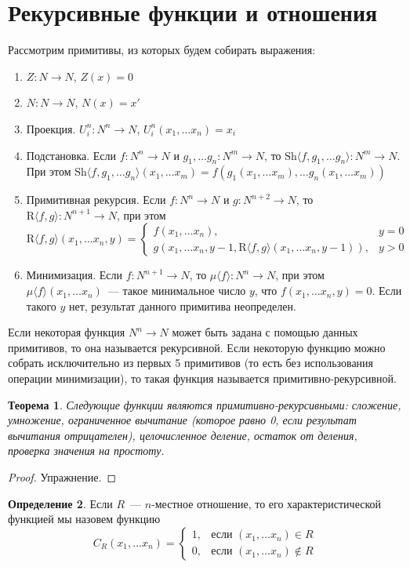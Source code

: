 \documentclass[a4paper,11pt]{article}
\newtheorem{thm}{Теорема}[section]
\theoremstyle{definition}
\newtheorem{dfn}[thm]{Определение}
\newcommand{\Sh}[1]{\mathrm{Sh}\langle #1\rangle}
\newcommand{\Rr}[1]{\mathrm{R}\langle #1\rangle}
\newcommand{\Mn}[1]{\mu\langle #1\rangle}
\begin{document}
\section{Рекурсивные функции и отношения}
Рассмотрим примитивы, из которых будем собирать выражения:
\begin{enumerate}
\item $Z : N \to N$, $Z(x) = 0$
\item $N : N \to N$, $N(x) = x'$
\item Проекция. $U^n_i : N^n \to N$, $U^n_i(x_1, \dots x_n) = x_i$
\item Подстановка. Если $f : N^n \to N$ и $g_1, \dots g_n : N^m \to N$, то
  $\Sh{f, g_1, \dots g_n} : N^m \to N$. При этом
  $\Sh{f, g_1, \dots g_n}(x_1, \dots x_m) = f(g_1(x_1, \dots x_m), \dots
  g_n(x_1, \dots x_m))$
\item Примитивная рекурсия. Если $f : N^n \to N$ и $g : N^{n+2} \to N$, то
  $\Rr{f, g} : N^{n+1} \to N$, при этом
  \[
  \Rr{f, g}(x_1, \dots x_n, y) =
  \begin{cases}
  f(x_1, \dots x_n), & y = 0\\
  g(x_1, \dots x_n, y-1, \Rr{f, g}(x_1, \dots x_n, y-1)), & y > 0
  \end{cases}
  \]
\item Минимизация. Если $f : N^{n+1} \to N$, то $\Mn{f} : N^n \to N$, при этом
  $\Mn{f}(x_1, \dots x_n)$~--- такое минимальное число $y$, что $f(x_1, \dots
  x_n, y) = 0$. Если такого $y$ нет, результат данного примитива неопределен.
\end{enumerate}

Если некоторая функция $N^n \to N$ может быть задана с помощью данных
примитивов, то она называется рекурсивной. Если некоторую функцию можно собрать
исключительно из первых 5 примитивов (то есть без использования операции
минимизации), то такая функция называется примитивно-рекурсивной.

\begin{thm}
Следующие функции являются примитивно-рекурсивными: сложение, умножение,
ограниченное вычитание (которое равно 0, если результат вычитания
отрицателен), целочисленное деление, остаток от деления, проверка значения на
простоту.
\end{thm}
\begin{proof}
Упражнение.
\end{proof}

\begin{dfn}
Если $R$~--- $n$-местное отношение, то его характеристической функцией мы
назовем функцию
\[
C_R(x_1, \dots x_n) =
\begin{cases}
1, & \text{если } (x_1, \dots x_n) \in R\\
0, & \text{если } (x_1, \dots x_n) \notin R
\end{cases}
\]
\end{dfn}
\end{document}

